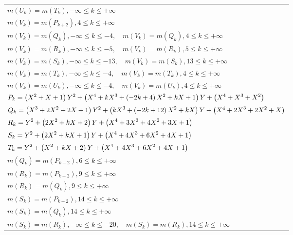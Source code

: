 \documentclass{amsart}
\begin{document}
\begin{longtable}{|l|}
\(\displaystyle m(U_k) = m(T_{k}),-\infty \leqslant k \leqslant +\infty\)\\
\(\displaystyle m(V_k) = m(P_{k
 + 2}),4 \leqslant k \leqslant +\infty\)\\
\(\displaystyle m(V_k) = m(Q_{k}),-\infty \leqslant k \leqslant -4,\quad m(V_k) = m(Q_{k}),4 \leqslant k \leqslant +\infty\)\\
\(\displaystyle m(V_k) = m(R_{k}),-\infty \leqslant k \leqslant -5,\quad m(V_k) = m(R_{k}),5 \leqslant k \leqslant +\infty\)\\
\(\displaystyle m(V_k) = m(S_{k}),-\infty \leqslant k \leqslant -13,\quad m(V_k) = m(S_{k}),13 \leqslant k \leqslant +\infty\)\\
\(\displaystyle m(V_k) = m(T_{k}),-\infty \leqslant k \leqslant -4,\quad m(V_k) = m(T_{k}),4 \leqslant k \leqslant +\infty\)\\
\(\displaystyle m(V_k) = m(U_{k}),-\infty \leqslant k \leqslant -4,\quad m(V_k) = m(U_{k}),4 \leqslant k \leqslant +\infty\)\\
\hline
\(\displaystyle P_k= \left(X^2
 + X
 + 1\right) \*Y^2
 + \left(X^4
 + k\*X^3
 + \left(-2\*k
 + 4\right) \*X^2
 + k\*X
 + 1\right) \*Y
 + \left(X^4
 + X^3
 + X^2\right) \)\\
\(\displaystyle Q_k= \left(X^3
 + 2\*X^2
 + 2\*X
 + 1\right) \*Y^2
 + \left(k\*X^3
 + \left(-2\*k
 + 12\right) \*X^2
 + k\*X\right) \*Y
 + \left(X^4
 + 2\*X^3
 + 2\*X^2
 + X\right) \)\\
\(\displaystyle R_k=Y^2
 + \left(2\*X^2
 + k\*X
 + 2\right) \*Y
 + \left(X^4
 + 3\*X^3
 + 4\*X^2
 + 3\*X
 + 1\right) \)\\
\(\displaystyle S_k=Y^2
 + \left(2\*X^2
 + k\*X
 + 1\right) \*Y
 + \left(X^4
 + 4\*X^3
 + 6\*X^2
 + 4\*X
 + 1\right) \)\\
\(\displaystyle T_k=Y^2
 + \left(X^2
 + k\*X
 + 2\right) \*Y
 + \left(X^4
 + 4\*X^3
 + 6\*X^2
 + 4\*X
 + 1\right) \)\\
\(\displaystyle m(Q_k) = m(P_{k
 - 2}),6 \leqslant k \leqslant +\infty\)\\
\(\displaystyle m(R_k) = m(P_{k
 - 2}),9 \leqslant k \leqslant +\infty\)\\
\(\displaystyle m(R_k) = m(Q_{k}),9 \leqslant k \leqslant +\infty\)\\
\(\displaystyle m(S_k) = m(P_{k
 - 2}),14 \leqslant k \leqslant +\infty\)\\
\(\displaystyle m(S_k) = m(Q_{k}),14 \leqslant k \leqslant +\infty\)\\
\(\displaystyle m(S_k) = m(R_{k}),-\infty \leqslant k \leqslant -20,\quad m(S_k) = m(R_{k}),14 \leqslant k \leqslant +\infty\)\\

\end{longtable}
\end{document}

